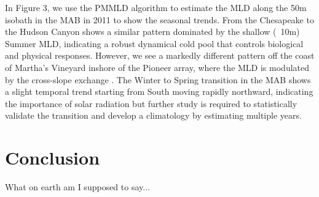 \documentclass{article}
\begin{document}
In Figure 3, we use the PMMLD algorithm to estimate the MLD along the 50m isobath in the MAB in 2011 to show the seasonal trends.
From the Chesapeake to the Hudson Canyon shows a similar pattern dominated by the shallow (~10m) Summer MLD, indicating a robust dynamical cold pool that controls biological and physical responses. 
However, we see a markedly different pattern off the coast of Martha's Vineyard inshore of the Pioneer array, where the MLD is modulated by the cross-slope exchange \cite{gawarkiewicz2018changing}.
The Winter to Spring transition in the MAB shows a slight temporal trend starting from South moving rapidly northward, indicating the importance of solar radiation but further study is required to statistically validate the transition and develop a climatology by estimating multiple years.

 


\section*{Conclusion}
What on earth am I supposed to say...




\newpage
\singlespacing
\printbibliography


 
\end{document}
